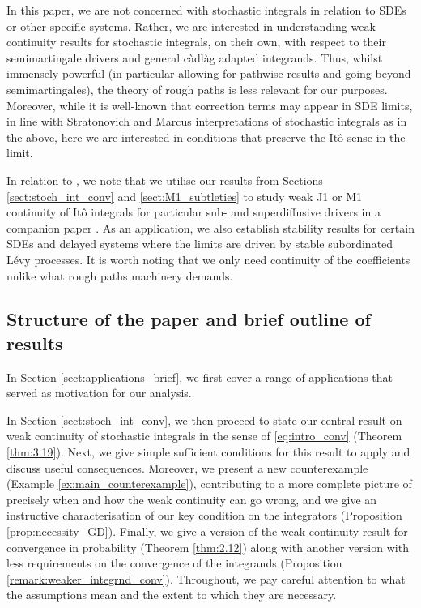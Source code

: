 \documentclass[11pt]{article}
\theoremstyle{definition}\newtheorem{example}[theorem]{Example}
\theoremstyle{definition}\newtheorem{counterexample}[theorem]{Counterexample}
\theoremstyle{definition}\newtheorem{remark}[theorem]{Remark}
\theoremstyle{definition}\newtheorem{defi}[theorem]{Definition}
\numberwithin{equation}{section}
\renewcommand{\|}{\; : \, \;}											%
\begin{document}
In this paper, we are not concerned with stochastic integrals in relation to SDEs or other specific systems. Rather, we are interested in understanding weak continuity results for stochastic integrals, on their own, with respect to their semimartingale drivers and general c\`adl\`ag adapted integrands. Thus, whilst immensely powerful (in particular allowing for pathwise results and going beyond semimartingales), the theory of rough paths is less relevant for our purposes. Moreover, while it is well-known that correction terms may appear in SDE limits, in line with Stratonovich and Marcus interpretations of stochastic integrals as in the above, here we are interested in conditions that preserve the It{\^o} sense in the limit.

In relation to \cite{chevryev_etal}, we note that we utilise our results from Sections \ref{sect:stoch_int_conv} and \ref{sect:M1_subtleties} to study weak J1 or M1 continuity of Itô integrals for particular sub- and superdiffusive drivers in a companion paper \cite{andreasfabrice}. As an application, we also establish stability results for certain SDEs and delayed systems where the limits are driven by stable subordinated L\'evy processes. It is worth noting that we only need continuity of the coefficients unlike what rough paths machinery demands.



\subsection{Structure of the paper and brief outline of results}

In Section \ref{sect:applications_brief}, we first cover a range of applications that served as motivation for our analysis.

In Section \ref{sect:stoch_int_conv}, we then proceed to state our central result on weak continuity of stochastic integrals in the sense of \eqref{eq:intro_conv} (Theorem \ref{thm:3.19}). Next, we give simple sufficient conditions for this result to apply and discuss useful consequences. Moreover, we present a new counterexample (Example \ref{ex:main_counterexample}), contributing to a more complete picture of precisely when and how the weak continuity can go wrong, and we give an instructive characterisation of our key condition on the integrators (Proposition \ref{prop:necessity_GD}). Finally, we give a version of the weak continuity result for convergence in probability (Theorem \ref{thm:2.12}) along with another version with less requirements on the convergence of the integrands (Proposition \ref{remark:weaker_integrnd_conv}). Throughout, we pay careful attention to what the assumptions mean and the extent to which they are necessary.
\end{document}
